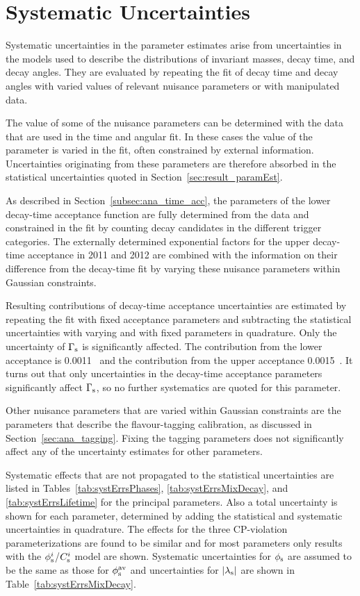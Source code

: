 \section{Systematic Uncertainties}
\label{sec:result_syst}

Systematic uncertainties in the parameter estimates arise from uncertainties in the models used to describe the distributions of invariant
masses, decay time, and decay angles. They are evaluated by repeating the fit of decay time and decay angles with varied values of relevant
nuisance parameters or with manipulated data.

The value of some of the nuisance parameters can be determined with the \BstoJpsiKK{} data that are used in the time and angular fit. In
these cases the value of the parameter is varied in the fit, often constrained by external information. Uncertainties originating from
these parameters are therefore absorbed in the statistical uncertainties quoted in Section~\ref{sec:result_paramEst}.

As described in Section~\ref{subsec:ana_time_acc}, the parameters of the lower decay-time acceptance function are fully determined from the
\BstoJpsiKK{} data and constrained in the fit by counting decay candidates in the different trigger categories. The externally determined
exponential factors for the upper decay-time acceptance in 2011 and 2012 are combined with the information on their difference from the
decay-time fit by varying these nuisance parameters within Gaussian constraints.

Resulting contributions of decay-time acceptance uncertainties are estimated by repeating the fit with fixed acceptance parameters and
subtracting the statistical uncertainties with varying and with fixed parameters in quadrature. Only the uncertainty of $\Gamma_\text{s}$ is
significantly affected. The contribution from the lower acceptance is 0.0011~\invps{} and the contribution from the upper acceptance
0.0015~\invps. It turns out that only uncertainties in the decay-time acceptance parameters significantly affect $\Gamma_\text{s}$, so no further
systematics are quoted for this parameter.

Other nuisance parameters that are varied within Gaussian constraints are the parameters that describe the flavour-tagging calibration, as
discussed in Section~\ref{sec:ana_tagging}. Fixing the tagging parameters does not significantly affect any of the uncertainty estimates
for other parameters.

Systematic effects that are not propagated to the statistical uncertainties are listed in Tables~\ref{tab:systErrsPhases},
\ref{tab:systErrsMixDecay}, and \ref{tab:systErrsLifetime} for the principal parameters. Also a total uncertainty is shown for each
parameter, determined by adding the statistical and systematic uncertainties in quadrature. The effects for the three CP-violation
parameterizations are found to be similar and for most parameters only results with the $\phi_\text{s}^{i}$/$C_\text{s}^{i}$ model are shown. Systematic
uncertainties for $\phi_\text{s}$ are assumed to be the same as those for $\phi_\text{s}^{\text{av}}$ and uncertainties for $|{\lambda_{\text{s}}}|$ are shown in
Table~\ref{tab:systErrsMixDecay}.

